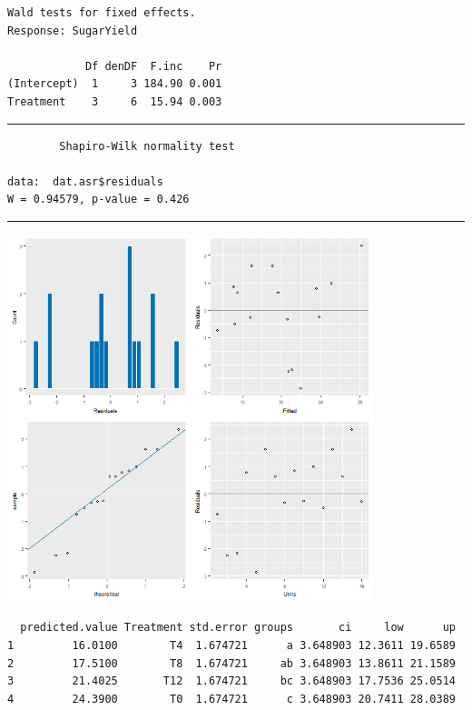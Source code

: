\documentclass[a4paper, 10pt, fleqn, twosided]{memoir}
\begin{document}
\begin{tcolorbox}[title = Exercise 12 output]
\begin{verbatim}
Wald tests for fixed effects.
Response: SugarYield

            Df denDF  F.inc    Pr
(Intercept)  1     3 184.90 0.001
Treatment    3     6  15.94 0.003

\end{verbatim}
{\color{outpt} {\hrule height 1pt}}
\begin{verbatim}
        Shapiro-Wilk normality test

data:  dat.asr$residuals
W = 0.94579, p-value = 0.426
\end{verbatim}
{\color{outpt} {\hrule height 1pt}} \vspace{0.2cm}

\includegraphics[width=0.8\textwidth, frame]{Exercise12Resplot.png}
\end{tcolorbox}

\begin{tcolorbox}[title = Exercise 12 output continued]
\begin{verbatim}
  predicted.value Treatment std.error groups       ci     low      up
1         16.0100        T4  1.674721      a 3.648903 12.3611 19.6589
2         17.5100        T8  1.674721     ab 3.648903 13.8611 21.1589
3         21.4025       T12  1.674721     bc 3.648903 17.7536 25.0514
4         24.3900        T0  1.674721      c 3.648903 20.7411 28.0389

\end{verbatim}
\end{tcolorbox}
\end{document}
